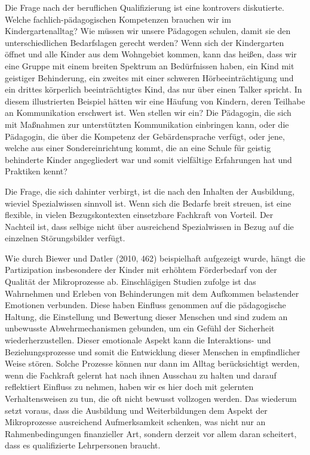 Die Frage nach der beruflichen Qualifizierung ist eine kontrovers diskutierte. Welche fachlich-pädagogischen Kompetenzen brauchen wir im Kindergartenalltag? Wie müssen wir unsere Pädagogen schulen, damit sie den unterschiedlichen Bedarfslagen gerecht werden? Wenn sich der Kindergarten öffnet und alle Kinder aus dem Wohngebiet kommen, kann das heißen, dass wir eine Gruppe mit einem breiten Spektrum an Bedürfnissen haben, ein Kind mit geistiger Behinderung, ein zweites mit einer schweren Hörbeeinträchtigung und ein drittes körperlich beeinträchtigtes Kind, das nur über einen Talker spricht.
In diesem illustrierten Beispiel hätten wir eine Häufung von Kindern, deren Teilhabe an Kommunikation erschwert ist. Wen stellen wir ein? Die Pädagogin, die sich mit Maßnahmen zur unterstützten Kommunikation einbringen kann, oder die Pädagogin, die über die Kompetenz der Gebärdensprache verfügt, oder jene, welche aus einer Sondereinrichtung kommt, die an eine Schule für geistig behinderte Kinder angegliedert war und somit vielfältige Erfahrungen hat und Praktiken kennt? 

Die Frage, die sich dahinter verbirgt, ist die nach den Inhalten der Ausbildung, wieviel Spezialwissen sinnvoll ist. Wenn sich die Bedarfe breit streuen, ist eine flexible, in vielen Bezugskontexten einsetzbare Fachkraft von Vorteil. Der Nachteil ist, dass selbige nicht über ausreichend Spezialwissen in Bezug auf die einzelnen Störungsbilder verfügt.

Wie durch Biewer und Datler (2010, 462) beispielhaft aufgezeigt wurde, hängt die Partizipation insbesondere der Kinder mit erhöhtem Förderbedarf von der Qualität der Mikroprozesse ab. Einschlägigen Studien zufolge ist das Wahrnehmen und Erleben von Behinderungen mit dem Aufkommen belastender Emotionen verbunden. Diese haben Einfluss genommen auf die pädagogische Haltung, die Einstellung und Bewertung dieser Menschen und sind zudem an unbewusste Abwehrmechanismen gebunden, um ein Gefühl der Sicherheit wiederherzustellen. Dieser emotionale Aspekt kann die Interaktions- und Beziehungsprozesse und somit die Entwicklung dieser Menschen in empfindlicher Weise stören. Solche Prozesse können nur dann im Alltag berücksichtigt werden, wenn die Fachkraft gelernt hat nach ihnen Ausschau zu halten und darauf reflektiert Einfluss zu nehmen, haben wir es hier doch mit gelernten Verhaltensweisen zu tun, die oft nicht bewusst vollzogen werden. Das wiederum setzt voraus, dass die Ausbildung und Weiterbildungen dem Aspekt der Mikroprozesse ausreichend Aufmerksamkeit schenken, was nicht nur an Rahmenbedingungen finanzieller Art, sondern derzeit vor allem daran scheitert, dass es qualifizierte Lehrpersonen braucht.  
    
